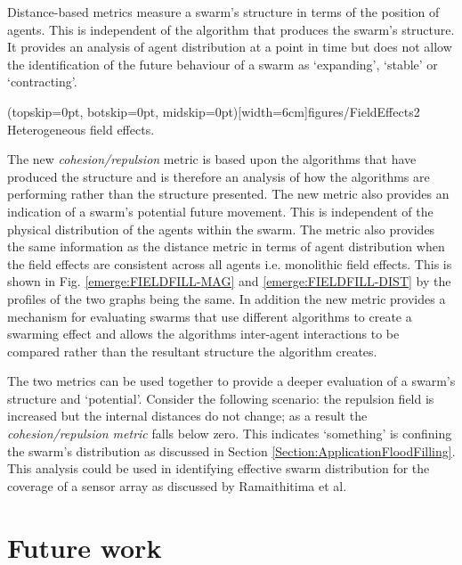 \documentclass{ieeeaccess}
\begin{document}
Distance-based metrics measure a swarm's structure in terms of the position of
agents. This is independent of the algorithm that produces the swarm's
structure. It provides an analysis of agent distribution at a point in time but
does not allow the identification of the future behaviour of a swarm as
`expanding', `stable' or `contracting'. 

\Figure[t!](topskip=0pt, botskip=0pt, midskip=0pt)[width=6cm]{figures/FieldEffects2}
{Heterogeneous field effects.\label{additional:fieldsWork}}

The new \textit{cohesion/repulsion} metric is based upon the algorithms that
have produced the structure and is therefore an analysis of how the algorithms
are performing rather than the structure presented. The new metric also
provides an indication of a swarm's potential future movement. This is
independent of the physical distribution of the agents within the swarm. The
metric also provides the same information as the distance metric in terms of
agent distribution when the field effects are consistent across all agents i.e.
monolithic field effects. This is shown in Fig. \ref{emerge:FIELDFILL-MAG} and
\ref{emerge:FIELDFILL-DIST} by the profiles of the two graphs being the same.
In addition the new metric provides a mechanism for evaluating swarms that use
different algorithms to create a swarming effect and allows the algorithms
inter-agent interactions to be compared rather than the resultant structure the
algorithm creates. 

The two metrics can be used together to provide a deeper evaluation of a
swarm's structure and `potential'. Consider the following scenario: the
repulsion field is increased but the internal distances do not change; as a
result the \textit{cohesion/repulsion metric} falls below zero. This indicates
`something' is confining the swarm's distribution as discussed in Section
\ref{Section:ApplicationFloodFilling}. This analysis could be used in
identifying effective swarm distribution for the coverage of a sensor array as
discussed by Ramaithitima et al.~\cite{RWBK:15}


\section{Future work}\label{Section:FutureWork}
\end{document}
